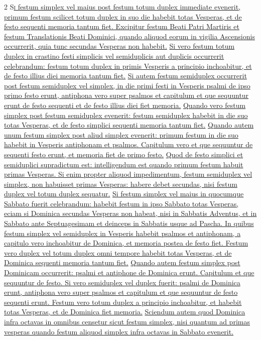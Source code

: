 \begin{multicols*}{2}
{\color{Red} }
\lettrine[lines=2]{\zallmancaps \color{Blue} S}{}\ul{\textsc{i} festum simplex vel maius post festum totum duplex immediate evenerit, primum festum scilicet totum duplex in suo die habebit totas Vesperas, et de festo sequenti memoria tantum fiet. Excipitur festum Beati Patri Martiris et festum Translationis Beati Dominici, quando aliquod eorum in vigilia Ascensionis occurrerit, quia tunc secundas Vesperas non habebit.}
\newline \ul{Si vero festum totum duplex in crastino festi simplicis vel semiduplicis aut duplicis occurrerit celebrandum: festum totum duplex in primis Vesperis a principio inchoabitur, et de festo illius diei memoria tantum fiet.}
\newline \ul{Si autem festum semiduplex occurrerit post festum semiduplex vel simplex, in die primi festi in Vesperis psalmi de ipso primo festo erunt, antiphona vero super psalmos et capitulum et que sequuntur erunt de festo sequenti et de festo illius diei fiet memoria.}
\newline \ul{Quando vero festum simplex post festum semiduplex evenerit: festum semiduplex habebit in die suo totas Vesperas, et de festo simplici sequenti memoria tantum fiet.}
\newline \ul{Quando autem unum festum simplex post aliud simplex evenerit: primum festum in die suo habebit in Vesperis antiphonam et psalmos. Capitulum vero et que sequuntur de sequenti festo erunt, et memoria fiet de primo festo.}
\newline \ul{Quod de festo simplici et semiduplici supradictum est: intelligendum est quando primum festum habuit primas Vesperas. Si enim propter aliquod impedimentum, festum semiduplex vel simplex, non habuisset primas Vesperas: habere debet secundas, nisi festum duplex vel totum duplex sequatur.}
\newline \ul{Si festum simplex vel maius in quocumque Sabbato fuerit celebrandum: habebit festum in ipso Sabbato totas Vesperas, eciam si Dominica secundas Vesperas non habeat, nisi in Sabbatis Adventus, et in Sabbato ante Septuagesimam et deinceps in Sabbatis usque ad Pascha. In quibus festum simplex vel semiduplex in Vesperis habebit psalmos et antiphonam, a capitulo vero inchoabitur de Dominica, et memoria postea de festo fiet. Festum vero duplex vel totum duplex omni tempore habebit totas Vesperas, et de Dominica sequenti memoria tantum fiet.}
\newline \ul{Quando autem festum simplex post Dominicam occurrerit: psalmi et antiphone de Dominica erunt. Capitulum et que sequuntur de festo. Si vero semiduplex vel duplex fuerit: psalmi de Dominica erunt, antiphona vero super psalmos et capitulum et que sequuntur de festo sequenti erunt. Festum vero totum duplex a principio inchoabitur, et habebit totas Vesperas, et de Dominica fiet memoria.}
\newline \ul{Sciendum autem quod Dominica infra octavas in omnibus censetur sicut festum simplex, nisi quantum ad primas vesperas quando festum aliquod simplex infra octavas in Sabbato evenerit.}


\end{multicols*}
